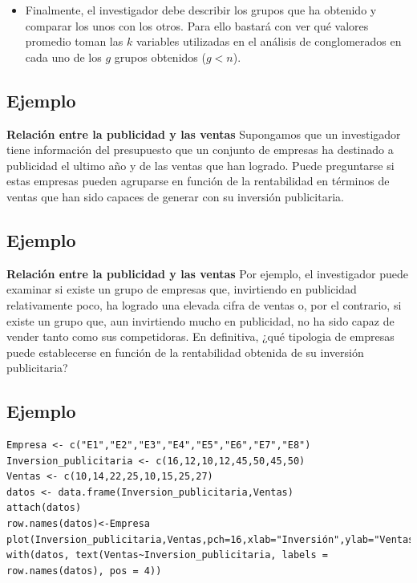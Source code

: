\documentclass[]{article}
\providecommand{\tightlist}{%
  \setlength{\itemsep}{0pt}\setlength{\parskip}{0pt}}
\begin{document}
\hypertarget{right}{}
\begin{itemize}
\tightlist
\item
  Finalmente, el investigador debe describir los grupos que ha obtenido
  y comparar los unos con los otros. Para ello bastará con ver qué
  valores promedio toman las \(k\) variables utilizadas en el análisis
  de conglomerados en cada uno de los \(g\) grupos obtenidos
  (\(g < n\)).
\end{itemize}

\subsection{Ejemplo}\label{ejemplo}

\textbf{Relación entre la publicidad y las ventas } Supongamos que un
investigador tiene información del presupuesto que un conjunto de
empresas ha destinado a publicidad el ultimo año y de las ventas que han
logrado. Puede preguntarse si estas empresas pueden agruparse en función
de la rentabilidad en términos de ventas que han sido capaces de generar
con su inversión publicitaria.

\subsection{Ejemplo}\label{ejemplo-1}

\textbf{Relación entre la publicidad y las ventas } Por ejemplo, el
investigador puede examinar si existe un grupo de empresas que,
invirtiendo en publicidad relativamente poco, ha logrado una elevada
cifra de ventas o, por el contrario, si existe un grupo que, aun
invirtiendo mucho en publicidad, no ha sido capaz de vender tanto como
sus competidoras. En definitiva, ¿qué tipologia de empresas puede
establecerse en función de la rentabilidad obtenida de su inversión
publicitaria?

\subsection{Ejemplo}\label{ejemplo-2}

\begin{verbatim}
Empresa <- c("E1","E2","E3","E4","E5","E6","E7","E8")
Inversion_publicitaria <- c(16,12,10,12,45,50,45,50)
Ventas <- c(10,14,22,25,10,15,25,27)
datos <- data.frame(Inversion_publicitaria,Ventas)
attach(datos)
row.names(datos)<-Empresa
plot(Inversion_publicitaria,Ventas,pch=16,xlab="Inversión",ylab="Ventas",xlim=c(5,60),ylim=c(5,30))
with(datos, text(Ventas~Inversion_publicitaria, labels = row.names(datos), pos = 4))


\end{verbatim}
\end{document}
